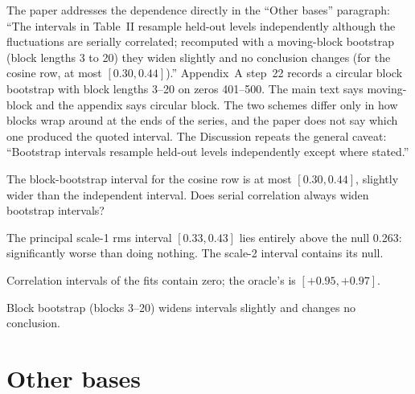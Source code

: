The paper addresses the dependence directly in the ``Other bases'' paragraph: ``The intervals in Table~II resample held-out levels independently although the fluctuations are serially correlated; recomputed with a moving-block bootstrap (block lengths 3 to 20) they widen slightly and no conclusion changes (for the cosine row, at most $[0.30,0.44]$).'' Appendix~A step~22 records a circular block bootstrap with block lengths 3--20 on zeros 401--500. The main text says moving-block and the appendix says circular block. The two schemes differ only in how blocks wrap around at the ends of the series, and the paper does not say which one produced the quoted interval. The Discussion repeats the general caveat: ``Bootstrap intervals resample held-out levels independently except where stated.''

\begin{checkpoint}
The block-bootstrap interval for the cosine row is at most $[0.30,0.44]$, slightly wider than the independent interval. Does serial correlation always widen bootstrap intervals?
\end{checkpoint}

\begin{keyideas}
\item The principal scale-1 rms interval $[0.33,0.43]$ lies entirely above the null 0.263: significantly worse than doing nothing. The scale-2 interval contains its null.
\item Correlation intervals of the fits contain zero; the oracle's is $[+0.95,+0.97]$.
\item Block bootstrap (blocks 3--20) widens intervals slightly and changes no conclusion.
\end{keyideas}

\section{Other bases}\label{sec:paper-memorization-bases}

